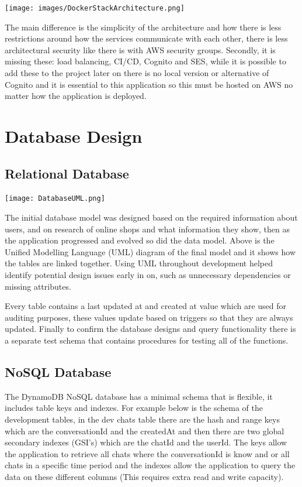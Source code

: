 \documentclass[]{project_report}
\begin{document}
\texttt{[image: images/DockerStackArchitecture.png]}

The main difference is the simplicity of the architecture and how there is less restrictions around how the services communicate with each other, there is less architectural security like there is with AWS security groups. Secondly, it is missing these: load balancing, CI/CD, Cognito and SES, while it is possible to add these to the project later on there is no local version or alternative of Cognito and it is essential to this application so this must be hosted on AWS no matter how the application is deployed. 


\section{Database Design}

\subsection{Relational Database}
\texttt{[image: DatabaseUML.png]}

The initial database model was designed based on the required information about users, and on research of online shops and what information they show, then as the application progressed and evolved so did the data model. Above is the Unified Modelling Language (UML) diagram of the final model and it shows how the tables are linked together. Using UML throughout development helped identify potential design issues early in on, such as unnecessary dependencies or missing attributes.

Every table contains a last updated at and created at value which are used for auditing purposes, these values update based on triggers so that they are always updated. Finally to confirm the database designs and query functionality there is a separate test schema that contains procedures for testing all of the functions.

\subsection{NoSQL Database}

The DynamoDB NoSQL database has a minimal schema that is flexible, it includes table keys and indexes. For example below is the schema of the development tables, in the dev chats table there are the hash and range keys which are the conversationId and the createdAt and then there are two global secondary indexes (GSI's) which are the chatId and the userId. The keys allow the application to retrieve all chats where the conversationId is know and or all chats in a specific time period and the indexes allow the application to query the data on these different columns (This requires extra read and write capacity).
\end{document}
